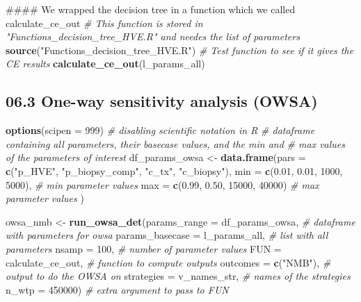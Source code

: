 \documentclass[]{article}
\newenvironment{Shaded}{\begin{snugshade}}{\end{snugshade}}
\newcommand{\KeywordTok}[1]{\textcolor[rgb]{0.13,0.29,0.53}{\textbf{#1}}}
\newcommand{\DataTypeTok}[1]{\textcolor[rgb]{0.13,0.29,0.53}{#1}}
\newcommand{\DecValTok}[1]{\textcolor[rgb]{0.00,0.00,0.81}{#1}}
\newcommand{\FloatTok}[1]{\textcolor[rgb]{0.00,0.00,0.81}{#1}}
\newcommand{\StringTok}[1]{\textcolor[rgb]{0.31,0.60,0.02}{#1}}
\newcommand{\CommentTok}[1]{\textcolor[rgb]{0.56,0.35,0.01}{\textit{#1}}}
\newcommand{\NormalTok}[1]{#1}
\begin{document}
\begin{Shaded}
\begin{Highlighting}[]
\NormalTok{#### We wrapped the decision tree in a function which we called calculate_ce_out }
\CommentTok{# This function is stored in "Functions_decision_tree_HVE.R" and needes the list of parameters}
\KeywordTok{source}\NormalTok{(}\StringTok{"Functions_decision_tree_HVE.R"}\NormalTok{)}
\CommentTok{# Test function to see if it gives the CE results}
\KeywordTok{calculate_ce_out}\NormalTok{(l_params_all)}
\end{Highlighting}
\end{Shaded}

\subsection{06.3 One-way sensitivity analysis
(OWSA)}\label{one-way-sensitivity-analysis-owsa}

\begin{Shaded}
\begin{Highlighting}[]
\KeywordTok{options}\NormalTok{(}\DataTypeTok{scipen =} \DecValTok{999}\NormalTok{) }\CommentTok{# disabling scientific notation in R}
\CommentTok{# dataframe containing all parameters, their basecase values, and the min and }
\CommentTok{# max values of the parameters of interest }
\NormalTok{df_params_owsa <-}\StringTok{ }\KeywordTok{data.frame}\NormalTok{(}\DataTypeTok{pars =} \KeywordTok{c}\NormalTok{(}\StringTok{"p_HVE"}\NormalTok{, }\StringTok{"p_biopsy_comp"}\NormalTok{, }\StringTok{"c_tx"}\NormalTok{, }\StringTok{"c_biopsy"}\NormalTok{),}
                             \DataTypeTok{min  =} \KeywordTok{c}\NormalTok{(}\FloatTok{0.01}\NormalTok{, }\FloatTok{0.01}\NormalTok{,  }\DecValTok{1000}\NormalTok{, }\DecValTok{5000}\NormalTok{),  }\CommentTok{# min parameter values}
                             \DataTypeTok{max  =} \KeywordTok{c}\NormalTok{(}\FloatTok{0.99}\NormalTok{, }\FloatTok{0.50}\NormalTok{, }\DecValTok{15000}\NormalTok{, }\DecValTok{40000}\NormalTok{)  }\CommentTok{# max parameter values}
\NormalTok{                             )}

\NormalTok{owsa_nmb <-}\StringTok{ }\KeywordTok{run_owsa_det}\NormalTok{(}\DataTypeTok{params_range =}\NormalTok{ df_params_owsa,  }\CommentTok{# dataframe with parameters for owsa}
                         \DataTypeTok{params_basecase =}\NormalTok{ l_params_all, }\CommentTok{# list with all parameters}
                         \DataTypeTok{nsamp      =} \DecValTok{100}\NormalTok{,               }\CommentTok{# number of parameter values}
                         \DataTypeTok{FUN        =}\NormalTok{ calculate_ce_out,  }\CommentTok{# function to compute outputs}
                         \DataTypeTok{outcomes   =} \KeywordTok{c}\NormalTok{(}\StringTok{"NMB"}\NormalTok{),          }\CommentTok{# output to do the OWSA on}
                         \DataTypeTok{strategies =}\NormalTok{ v_names_str,       }\CommentTok{# names of the strategies}
                         \DataTypeTok{n_wtp      =} \DecValTok{450000}\NormalTok{)            }\CommentTok{# extra argument to pass to FUN}
\end{Highlighting}
\end{Shaded}
\end{document}
